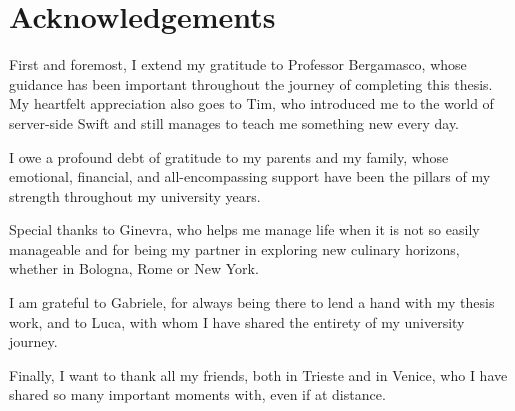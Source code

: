 \chapter*{Acknowledgements}
First and foremost, I extend my gratitude to Professor Bergamasco, whose guidance has been important throughout the journey of completing this thesis. My heartfelt appreciation also goes to Tim, who introduced me to the world of server-side Swift and still manages to teach me something new every day.

I owe a profound debt of gratitude to my parents and my family, whose emotional, financial, and all-encompassing support have been the pillars of my strength throughout my university years.

Special thanks to Ginevra, who helps me manage life when it is not so easily manageable and for being my partner in exploring new culinary horizons, whether in Bologna, Rome or New York.

I am grateful to Gabriele, for always being there to lend a hand with my thesis work, and to Luca, with whom I have shared the entirety of my university journey.

Finally, I want to thank all my friends, both in Trieste and in Venice, who I have shared so many important moments with, even if at distance.